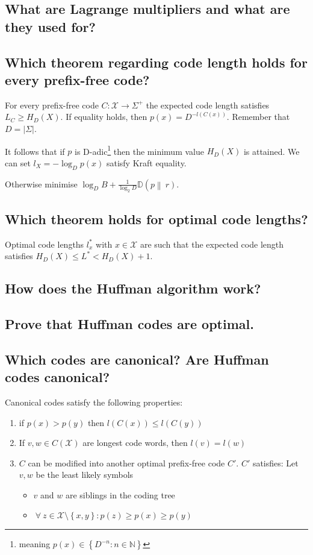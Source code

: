 \documentclass[a4paper]{article}
\newcommand\kld[3][D]{\mathbb{#1}\left(#2 \left\|\:#3\right)\right.}
\newcommand\fall{\:\forall\:}
\newcommand\set[1]{\left\{#1\right\}}
\newcommand\card[1]{\left|#1\right|}
\theoremstyle{definition}
\begin{document}
\subsection{What are Lagrange multipliers and what are they used for?}

\subsection{Which theorem regarding code length holds for every prefix-free code?}

For every prefix-free code $C: \mathcal{X} \rightarrow \Sigma^+$ the expected code length satisfies $L_C \geq H_D(X)$.
If equality holds, then $p(x) = D^{-l(C(x))}$. Remember that $D = \card{\Sigma}$.

It follows that if $p$ is D-adic\footnote{meaning $p(x) \in \set{D^{-n}: n \in \mathbb{N}}$} then the minimum value $H_D(X)$ is attained. We can set $l_X = -\log_D p(x)$ satisfy Kraft equality.

Otherwise minimise $\log_D{B} + \frac{1}{\log_2 D} \kld pr$.

\subsection{Which theorem holds for optimal code lengths?}

Optimal code lengths $l_x^*$ with $x \in \mathcal{X}$ are such that the expected code length satisfies $H_D(X) \leq L^* < H_D(X) + 1$.

\subsection{How does the Huffman algorithm work?}

\subsection{Prove that Huffman codes are optimal.}

\subsection{Which codes are canonical? Are Huffman codes canonical?}

Canonical codes satisfy the following properties:

\begin{enumerate}
  \item if $p(x) > p(y)$ then $l(C(x)) \leq l(C(y))$
  \item If $v,w \in C(\mathcal{X})$ are longest code words, then $l(v) = l(w)$
  \item $C$ can be modified into another optimal prefix-free code $C'$. $C'$ satisfies:
    Let $v, w$ be the least likely symbols
    \begin{itemize}
      \item $v$ and $w$ are siblings in the coding tree
      \item $\fall z \in \mathcal{X} \setminus \set{x,y}: p(z) \geq p(x) \geq p(y)$
    \end{itemize}
\end{enumerate}
\end{document}
